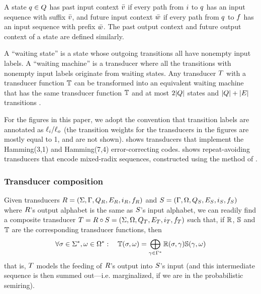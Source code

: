 \documentclass[english]{article}
\begin{document}
A state $q \in Q$ has past input context $\bar{v}$ if every path from $i$ to $q$ has an input sequence with suffix $\bar{v}$,
and future input context $\bar{w}$ if every path from $q$ to $f$ has an input sequence with prefix $\bar{w}$.
The past output context and future output context of a state are defined similarly.

A ``waiting state'' is a state whose outgoing transitions all have nonempty input labels.
A ``waiting machine'' is a transducer where all the transitions with nonempty input labels
originate from waiting states.
Any transducer $T$ with a transducer function $\mathbb{T}$
can be transformed into an equivalent waiting machine
that has the same transducer function $\mathbb{T}$ and
at most $2|Q|$ states and $|Q|+|E|$ transitions
\cite{WestessonEtAlArxiv2012}.

For the figures in this paper,
we adopt the convention that transition labels are annotated as $\ell_i{\tt /}\ell_o$
(the transition weights for the transducers in the figures are mostly equal to 1, and are not shown).
 shows transducers that implement the Hamming(3,1) and Hamming(7,4) error-correcting codes.
 shows repeat-avoiding transducers that encode mixed-radix sequences,
constructed using the method of .

\subsubsection{Transducer composition}

Given transducers
 $R = (\Sigma, \Gamma, Q_{R}, E_{R}, i_{R}, f_{R})$ and
 $S = (\Gamma, \Omega, Q_{S}, E_{S}, i_{S}, f_{S})$
where $R$'s output alphabet is the same as $S$'s input alphabet,
we can readily find a composite transducer
 $T = R \circ S = (\Sigma, \Omega, Q_{T}, E_{T}, i_{T}, f_{T})$
such that, if $\mathbb{R}$, $\mathbb{S}$ and $\mathbb{T}$ are the corresponding transducer functions,
then
\[
\forall \sigma \in {\Sigma}^{\ast}, \omega \in {\Omega}^{\ast}:
\quad
\mathbb{T}(\sigma,\omega) = \bigoplus_{\gamma \in {\Gamma}^{\ast}} \mathbb{R}(\sigma,\gamma) \mathbb{S}(\gamma,\omega)
\]
that is, $T$ models the feeding of $R$'s output into $S$'s input
(and this intermediate sequence is then summed out---i.e. marginalized, if we are in the probabilistic semiring).
\end{document}
